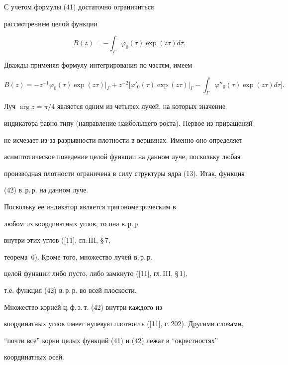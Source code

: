  


 


\begin{pf} 


С учетом формулы (41) достаточно ограничиться 


рассмотрением целой функции 


\begin{equation} 


B(z)=-\int_\Gamma \varphi_0(\tau)\exp(z\tau)d\tau. 


\end{equation} 


Дважды применяя формулу интегрирования по частям, имеем 


$$ 


B(z)=-z^{-1}\varphi_0(\tau)\exp(z\tau)\big|_\Gamma 


+z^{-2}\bigg[\varphi'_0(\tau)\exp(z\tau)\big|_\Gamma 


-\int_\Gamma \varphi''_0(\tau)\exp(z\tau)d\tau\bigg]. 


$$ 


Луч $\arg z=\pi/4$ является одним из четырех лучей, на которых значение 


индикатора равно типу (направление наибольшего роста). Первое из приращений 


не исчезает из-за разрывности плотности в вершинах. Именно оно определяет 


асимптотическое поведение целой функции на данном луче, поскольку любая 


производная плотности ограничена в силу структуры ядра (13). Итак, функция 


(42) в.\,р.\,р. на данном луче. 


Поскольку ее индикатор является тригонометрическим в 


любом из координатных углов, то она в.\,р.\,р. 


внутри этих углов ([11], гл.\,III, \S\,7, 


теорема~6). Кроме того, множество лучей в.\,р.\,р. 


целой функции либо пусто, либо замкнуто ([11], гл.\,III, \S\,1), 


т.е. функция (42) в.\,р.\,р. во всей плоскости. 


\end{pf} 


 


 


\begin{cor} 


Множество корней ц.\,ф.\,э.\,т. (42) внутри каждого из 


координатных углов имеет нулевую плотность ([11], с.\,202). Другими словами, 


``почти все'' корни целых функций (41) и (42) лежат в ``окрестностях'' 


координатных осей. 


\end{cor} 


